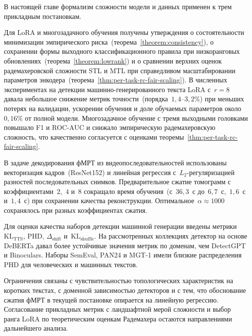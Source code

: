 В настоящей главе формализм сложности модели и данных применен к трем прикладным постановкам.

Для LoRA и многозадачного обучения получены утверждения о состоятельности минимизации эмпирического риска~(теорема~\ref{theorem:consistency}), о сохранении формы выходного классификационного правила при низкоранговых обновлениях~(теорема~\ref{theorem:lowrank}) и о сравнении верхних оценок радемахеровской сложности STL и MTL при справедливом масштабировании параметров энкодера~(теорема~\ref{thm:per-task-rc-fair-scaling}).
В численных экспериментах на детекции машинно-генерированного текста LoRA с~$r=8$ давала небольшое снижение метрик точности~(порядка~$1{,}4$--$3{,}2\%$) при меньших потерях на валидации, ускорении обучения и доле обучаемых параметров около~$0{,}16\%$ от полной модели.
Многозадачное обучение с тремя выходными головками повышало F1 и ROC-AUC и снижало эмпирическую радемахеровскую сложность, что качественно согласуется с оценками теоремы~\ref{thm:per-task-rc-fair-scaling}.

В задаче декодирования фМРТ из видеопоследовательностей использованы векторизация кадров~(ResNet152) и линейная регрессия с~$L_2$-регуляризацией разностей последовательных снимков.
Предварительное сжатие томограмм с коэффициентами~$2$,~$4$ и~$8$ сокращало время обучения~(с~$36{,}3$~с до~$6{,}7$~с,~$1{,}6$~с и~$1{,}4$~с) при сохранении качества реконструкции. Оптимальное~$\alpha\approx 1000$ сохранялось при разных коэффициентах сжатия.

Для оценки качества наборов детекции машинной генерации введены метрики~$\text{KL}_{\text{TTS}}$, PHD, $\Delta_{\text{shift}}$ и~$\text{KL}_\text{shuffle}$.
На рассмотренных коллекциях детектор на основе DeBERTa давал более устойчивые значения метрик по доменам, чем DetectGPT и Binoculars. Наборы SemEval, PAN24 и MGT-1 имели близкие распределения PHD для человеческих и машинных текстов.

Ограничения связаны с чувствительностью топологических характеристик на коротких текстах, с доменной зависимостью детекторов и с тем, что обоснование сжатия фМРТ в текущей постановке опирается на линейную регрессию.
Согласование прикладных метрик с ландшафтной мерой сложности и выбор ранга LoRA по теоретическим оценкам Радемахера остаются направлениями дальнейшего анализа.